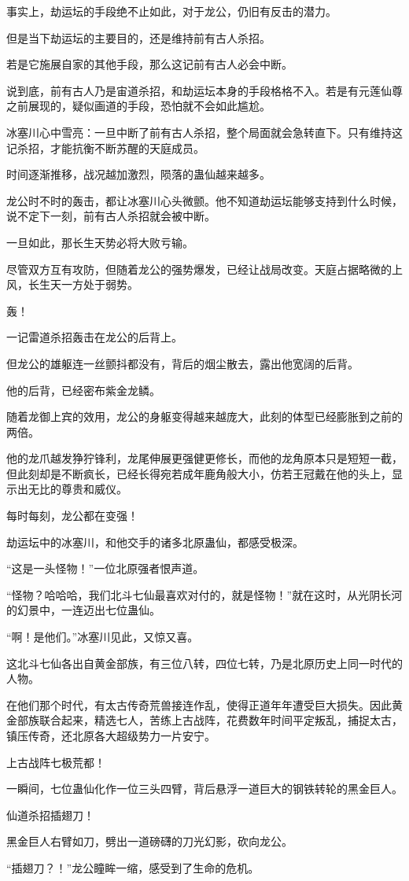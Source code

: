 \begin{this_body}
事实上，劫运坛的手段绝不止如此，对于龙公，仍旧有反击的潜力。

但是当下劫运坛的主要目的，还是维持前有古人杀招。

若是它施展自家的其他手段，那么这记前有古人必会中断。

说到底，前有古人乃是宙道杀招，和劫运坛本身的手段格格不入。若是有元莲仙尊之前展现的，疑似画道的手段，恐怕就不会如此尴尬。

冰塞川心中雪亮：一旦中断了前有古人杀招，整个局面就会急转直下。只有维持这记杀招，才能抗衡不断苏醒的天庭成员。

时间逐渐推移，战况越加激烈，陨落的蛊仙越来越多。

龙公时不时的轰击，都让冰塞川心头微颤。他不知道劫运坛能够支持到什么时候，说不定下一刻，前有古人杀招就会被中断。

一旦如此，那长生天势必将大败亏输。

尽管双方互有攻防，但随着龙公的强势爆发，已经让战局改变。天庭占据略微的上风，长生天一方处于弱势。

轰！

一记雷道杀招轰击在龙公的后背上。

但龙公的雄躯连一丝颤抖都没有，背后的烟尘散去，露出他宽阔的后背。

他的后背，已经密布紫金龙鳞。

随着龙御上宾的效用，龙公的身躯变得越来越庞大，此刻的体型已经膨胀到之前的两倍。

他的龙爪越发狰狞锋利，龙尾伸展更强健更修长，而他的龙角原本只是短短一截，但此刻却是不断疯长，已经长得宛若成年鹿角般大小，仿若王冠戴在他的头上，显示出无比的尊贵和威仪。

每时每刻，龙公都在变强！

劫运坛中的冰塞川，和他交手的诸多北原蛊仙，都感受极深。

“这是一头怪物！”一位北原强者恨声道。

“怪物？哈哈哈，我们北斗七仙最喜欢对付的，就是怪物！”就在这时，从光阴长河的幻景中，一连迈出七位蛊仙。

“啊！是他们。”冰塞川见此，又惊又喜。

这北斗七仙各出自黄金部族，有三位八转，四位七转，乃是北原历史上同一时代的人物。

在他们那个时代，有太古传奇荒兽接连作乱，使得正道年年遭受巨大损失。因此黄金部族联合起来，精选七人，苦练上古战阵，花费数年时间平定叛乱，捕捉太古，镇压传奇，还北原各大超级势力一片安宁。

上古战阵七极荒都！

一瞬间，七位蛊仙化作一位三头四臂，背后悬浮一道巨大的钢铁转轮的黑金巨人。

仙道杀招插翅刀！

黑金巨人右臂如刀，劈出一道磅礴的刀光幻影，砍向龙公。

“插翅刀？！”龙公瞳眸一缩，感受到了生命的危机。

\end{this_body}

